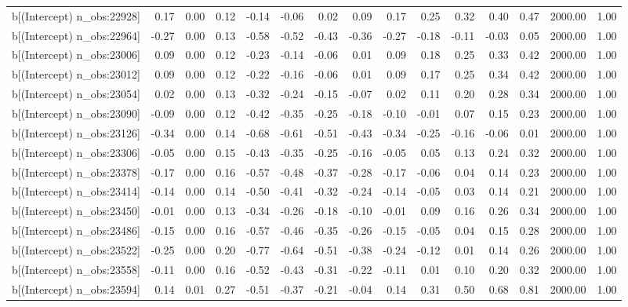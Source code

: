 \begin{table}[ht]
\begin{tabular}{rrrrrrrrrrrrrrr}
  b[(Intercept) n\_obs:22928] & 0.17 & 0.00 & 0.12 & -0.14 & -0.06 & 0.02 & 0.09 & 0.17 & 0.25 & 0.32 & 0.40 & 0.47 & 2000.00 & 1.00 \\ 
  b[(Intercept) n\_obs:22964] & -0.27 & 0.00 & 0.13 & -0.58 & -0.52 & -0.43 & -0.36 & -0.27 & -0.18 & -0.11 & -0.03 & 0.05 & 2000.00 & 1.00 \\ 
  b[(Intercept) n\_obs:23006] & 0.09 & 0.00 & 0.12 & -0.23 & -0.14 & -0.06 & 0.01 & 0.09 & 0.18 & 0.25 & 0.33 & 0.42 & 2000.00 & 1.00 \\ 
  b[(Intercept) n\_obs:23012] & 0.09 & 0.00 & 0.12 & -0.22 & -0.16 & -0.06 & 0.01 & 0.09 & 0.17 & 0.25 & 0.34 & 0.42 & 2000.00 & 1.00 \\ 
  b[(Intercept) n\_obs:23054] & 0.02 & 0.00 & 0.13 & -0.32 & -0.24 & -0.15 & -0.07 & 0.02 & 0.11 & 0.20 & 0.28 & 0.34 & 2000.00 & 1.00 \\ 
  b[(Intercept) n\_obs:23090] & -0.09 & 0.00 & 0.12 & -0.42 & -0.35 & -0.25 & -0.18 & -0.10 & -0.01 & 0.07 & 0.15 & 0.23 & 2000.00 & 1.00 \\ 
  b[(Intercept) n\_obs:23126] & -0.34 & 0.00 & 0.14 & -0.68 & -0.61 & -0.51 & -0.43 & -0.34 & -0.25 & -0.16 & -0.06 & 0.01 & 2000.00 & 1.00 \\ 
  b[(Intercept) n\_obs:23306] & -0.05 & 0.00 & 0.15 & -0.43 & -0.35 & -0.25 & -0.16 & -0.05 & 0.05 & 0.13 & 0.24 & 0.32 & 2000.00 & 1.00 \\ 
  b[(Intercept) n\_obs:23378] & -0.17 & 0.00 & 0.16 & -0.57 & -0.48 & -0.37 & -0.28 & -0.17 & -0.06 & 0.04 & 0.14 & 0.23 & 2000.00 & 1.00 \\ 
  b[(Intercept) n\_obs:23414] & -0.14 & 0.00 & 0.14 & -0.50 & -0.41 & -0.32 & -0.24 & -0.14 & -0.05 & 0.03 & 0.14 & 0.21 & 2000.00 & 1.00 \\ 
  b[(Intercept) n\_obs:23450] & -0.01 & 0.00 & 0.13 & -0.34 & -0.26 & -0.18 & -0.10 & -0.01 & 0.09 & 0.16 & 0.26 & 0.34 & 2000.00 & 1.00 \\ 
  b[(Intercept) n\_obs:23486] & -0.15 & 0.00 & 0.16 & -0.57 & -0.46 & -0.35 & -0.26 & -0.15 & -0.05 & 0.04 & 0.15 & 0.28 & 2000.00 & 1.00 \\ 
  b[(Intercept) n\_obs:23522] & -0.25 & 0.00 & 0.20 & -0.77 & -0.64 & -0.51 & -0.38 & -0.24 & -0.12 & 0.01 & 0.14 & 0.26 & 2000.00 & 1.00 \\ 
  b[(Intercept) n\_obs:23558] & -0.11 & 0.00 & 0.16 & -0.52 & -0.43 & -0.31 & -0.22 & -0.11 & 0.01 & 0.10 & 0.20 & 0.32 & 2000.00 & 1.00 \\ 
  b[(Intercept) n\_obs:23594] & 0.14 & 0.01 & 0.27 & -0.51 & -0.37 & -0.21 & -0.04 & 0.14 & 0.31 & 0.50 & 0.68 & 0.81 & 2000.00 & 1.00 \\ 

\end{tabular}
\end{table}
